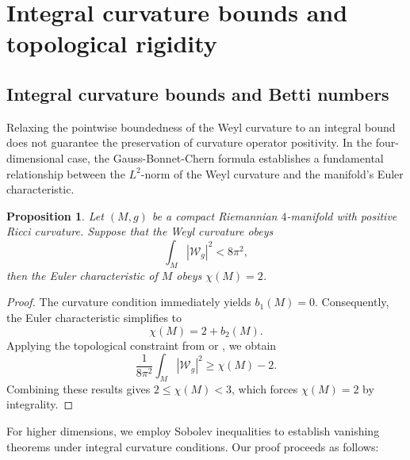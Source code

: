 \documentclass[12pt, twoside]{article}
\newtheorem{proposition}[theorem]{Proposition}
\theoremstyle{definition}
\numberwithin{equation}{section}
\begin{document}
\section{ Integral curvature bounds and topological rigidity }
\subsection{Integral curvature bounds and Betti numbers }
Relaxing the pointwise boundedness of the Weyl curvature to an integral bound does not guarantee the preservation of curvature operator positivity. In the four-dimensional case, the Gauss-Bonnet-Chern formula establishes a fundamental relationship between the $L^{2}$-norm of the Weyl curvature and the manifold's Euler characteristic.
\begin{proposition}
Let $(M,g)$ be a compact Riemannian $4$-manifold with positive Ricci curvature. Suppose that the Weyl curvature obeys
$$\int_{M}|\mathcal{W}_{g}|^{2}<8\pi^{2},$$
then the Euler characteristic of $M$ obeys $\chi(M)=2$.
\end{proposition}
\begin{proof}
The curvature condition immediately yields $b_{1}(M)=0$. Consequently, the Euler characteristic simplifies to
$$\chi(M)=2+b_{2}(M).$$
Applying the topological constraint from \cite[Theorem 1.1]{Ses06} or \cite[Lemma 2.5]{Gur94}, we obtain 
$$\frac{1}{8\pi^{2}}\int_{M}|\mathcal{W}_{g}|^{2}\geq\chi(M)-2.$$
Combining these results gives $2\leq \chi(M)<3$, which forces $\chi(M)=2$ by integrality.
\end{proof}
For higher dimensions, we employ Sobolev inequalities to establish vanishing theorems under integral curvature conditions. Our proof proceeds as follows:
\end{document}
